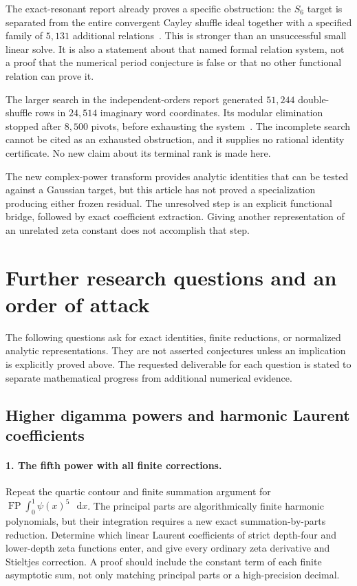 \documentclass[11pt,a4paper]{article}
\numberwithin{equation}{section}
\theoremstyle{definition}
\theoremstyle{remark}
\DeclareMathOperator{\FP}{FP}
\newcommand{\dd}{\mathop{}\!\mathrm{d}}
\begin{document}
The exact-resonant report already proves a specific obstruction:
the $S_6$ target is separated from the entire convergent Cayley
shuffle ideal together with a specified family of $5{,}131$
additional relations~\cite{IncomingExact}. This is stronger than
an unsuccessful small linear solve. It is also a statement about
that named formal relation system, not a proof that the numerical
period conjecture is false or that no other functional relation
can prove it.

The larger search in the independent-orders report generated
$51{,}244$ double-shuffle rows in $24{,}514$ imaginary word
coordinates. Its modular elimination stopped after $8{,}500$
pivots, before exhausting the system~\cite{IncomingIndependent}.
The incomplete search cannot be cited as an exhausted obstruction,
and it supplies no rational identity certificate. No new claim
about its terminal rank is made here.

The new complex-power transform provides analytic identities that
can be tested against a Gaussian target, but this article has not
proved a specialization producing either frozen residual. The
unresolved step is an explicit functional bridge, followed by
exact coefficient extraction. Giving another representation of
an unrelated zeta constant does not accomplish that step.




\section{Further research questions and an order of attack}
\label{research:section}

The following questions ask for exact identities, finite reductions,
or normalized analytic representations. They are not asserted
conjectures unless an implication is explicitly proved above.
The requested deliverable for each question is stated to separate
mathematical progress from additional numerical evidence.

\subsection{Higher digamma powers and harmonic Laurent coefficients}

\paragraph{1. The fifth power with all finite corrections.}
Repeat the quartic contour and finite summation argument for
$\FP\int_0^1\psi(x)^5\,\dd x$. The principal parts are
algorithmically finite harmonic polynomials, but their integration
requires a new exact summation-by-parts reduction. Determine
which linear Laurent coefficients of strict depth-four and
lower-depth zeta functions enter, and give every ordinary zeta
derivative and Stieltjes correction. A proof should include the
constant term of each finite asymptotic sum, not only matching
principal parts or a high-precision decimal.
\end{document}
